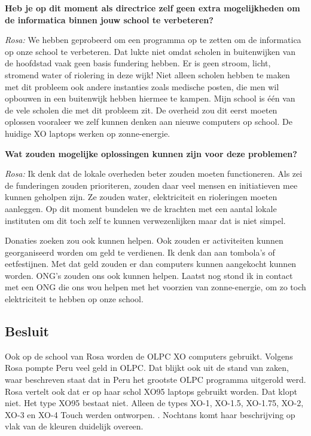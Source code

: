 \textbf{Heb je op dit moment als directrice zelf geen extra mogelijkheden om de informatica binnen jouw school te verbeteren?}

\textit{Rosa:} We hebben geprobeerd om een programma op te zetten om de informatica op onze school te verbeteren. Dat lukte niet omdat scholen in buitenwijken van de hoofdstad vaak geen basis fundering hebben. Er is geen stroom, licht, stromend water of riolering in deze wijk! Niet alleen scholen hebben te maken met dit probleem ook andere instanties zoals medische posten, die men wil opbouwen in een buitenwijk hebben hiermee te kampen. Mijn school is één van de vele scholen die met dit probleem zit. De overheid zou dit eerst moeten oplossen vooraleer we zelf kunnen denken aan nieuwe computers op school. De huidige XO laptops werken op zonne-energie. 

\textbf{Wat zouden mogelijke oplossingen kunnen zijn voor deze problemen?}

\textit{Rosa:} Ik denk dat de lokale overheden beter zouden moeten functioneren. Als zei de funderingen zouden prioriteren, zouden daar veel mensen en initiatieven mee kunnen geholpen zijn. Ze zouden water, elektriciteit en rioleringen moeten aanleggen. Op dit moment bundelen we de krachten met een aantal lokale instituten om dit toch zelf te kunnen verwezenlijken maar dat is niet simpel. 

Donaties zoeken zou ook kunnen helpen. Ook zouden er activiteiten kunnen georganiseerd worden om geld te verdienen. Ik denk dan aan tombola's of eetfestijnen. Met dat geld zouden er dan computers kunnen aangekocht kunnen worden. ONG's zouden ons ook kunnen helpen. Laatst nog stond ik in contact met een ONG die ons wou helpen met het voorzien van zonne-energie, om zo toch elektriciteit te hebben op onze school.

\subsection{Besluit}
Ook op de school van Rosa worden de OLPC XO computers gebruikt. Volgens Rosa pompte Peru veel geld in OLPC. Dat blijkt ook uit de stand van zaken, waar beschreven staat dat in Peru het grootste OLPC programma uitgerold werd. Rosa vertelt ook dat er op haar schol XO95 laptops gebruikt worden. Dat klopt niet. Het type XO95 bestaat niet. Alleen de types XO-1, XO-1.5, XO-1.75, XO-2, XO-3 en XO-4 Touch werden ontworpen. \autocite{OLPC2016}. Nochtans komt haar beschrijving op vlak van de kleuren duidelijk overeen. 

